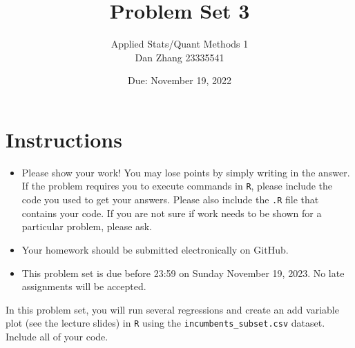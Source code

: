 \documentclass[12pt,letterpaper]{article}
\title{Problem Set 3}
\date{Due: November 19, 2022}
\author{Applied Stats/Quant Methods 1 \\ Dan Zhang 23335541}
\begin{document}
	\maketitle
	\section*{Instructions}
	\begin{itemize}
		\item Please show your work! You may lose points by simply writing in the answer. If the problem requires you to execute commands in \texttt{R}, please include the code you used to get your answers. Please also include the \texttt{.R} file that contains your code. If you are not sure if work needs to be shown for a particular problem, please ask.
	\item Your homework should be submitted electronically on GitHub.
	\item This problem set is due before 23:59 on Sunday November 19, 2023. No late assignments will be accepted.

	\end{itemize}

		\vspace{.25cm}
	
\noindent In this problem set, you will run several regressions and create an add variable plot (see the lecture slides) in \texttt{R} using the \texttt{incumbents\_subset.csv} dataset. Include all of your code.

	\vspace{.5cm}
\end{document}
